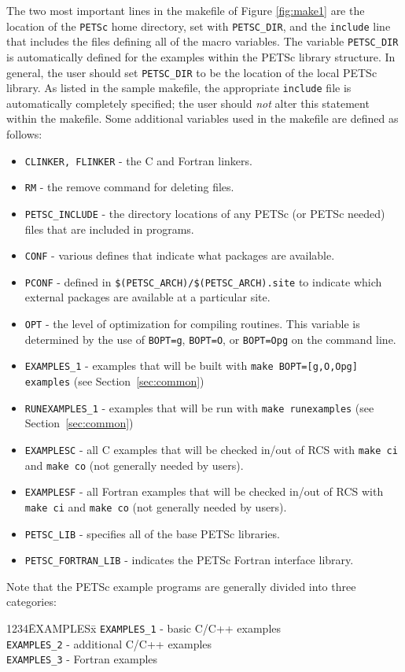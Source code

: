 The two most important lines in the makefile of Figure \ref{fig:make1}
are the location of the {\tt PETSc} home directory, set with {\tt PETSC\_DIR}, 
and the {\tt include} line that includes the files
defining all of the macro variables. The variable {\tt PETSC\_DIR} is
automatically defined for the examples within the PETSc library 
structure.  In general, the user should set {\tt PETSC\_DIR} 
to  be the location of the local
PETSc library.  As listed in the sample makefile, the appropriate
{\tt include} file is automatically completely specified; the user should
{\em not} alter this statement within the makefile.  Some additional
variables used in the makefile are defined as follows:
\begin{itemize}
\item {\tt CLINKER, FLINKER} - the C and Fortran linkers. 
\item {\tt RM} - the remove command for deleting files.
\item {\tt PETSC\_INCLUDE} - the directory locations of any PETSc (or PETSc
            needed) files that are included in programs. 
\item {\tt CONF} - various defines that indicate what packages are available.
\item {\tt PCONF} - defined in {\tt \$(PETSC\_ARCH)/\$(PETSC\_ARCH).site} to 
            indicate which external packages are available at a particular site.
\item {\tt OPT} - the level of optimization for compiling routines.
            This variable is determined by the use of {\tt BOPT=g},
            {\tt BOPT=O}, or {\tt BOPT=Opg} on the command line.
\item {\tt EXAMPLES\_1} - examples that will be built with
             {\tt make BOPT=[g,O,Opg] examples} (see Section~\ref{sec:common})
\item {\tt RUNEXAMPLES\_1} - examples that will be run with
             {\tt make runexamples} (see Section~\ref{sec:common})
\item {\tt EXAMPLESC} - all C examples that will be checked in/out of RCS
             with {\tt make ci} and {\tt make co} (not generally
             needed by users).
\item {\tt EXAMPLESF} - all Fortran examples that will be checked in/out of
             RCS with {\tt make ci} and {\tt make co} (not generally
             needed by users).
\item {\tt PETSC\_LIB} - specifies all of the base PETSc libraries.
\item {\tt PETSC\_FORTRAN\_LIB} - indicates the PETSc Fortran interface 
             library. 
\end{itemize}
Note that the PETSc example programs are generally divided into three 
categories: 
\begin{tabbing}
1234\= EXAMPLESx\= \kill
\> {\tt EXAMPLES\_1} \> - basic C/C++ examples\\
\> {\tt EXAMPLES\_2} \> - additional C/C++ examples\\
\> {\tt EXAMPLES\_3} \> - Fortran examples\\
\end{tabbing}

